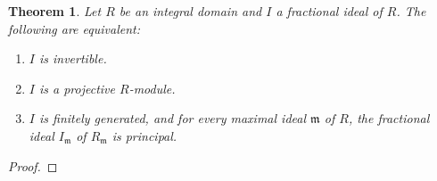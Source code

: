 \documentclass[11pt]{article}
\theoremstyle{thmstyle}
\newtheorem{theorem}{Theorem}[section]
\theoremstyle{defstyle}
\newcommand{\frakm}{\mathfrak{m}} %
\begin{document}
\begin{theorem}
    Let $R$ be an integral domain and $I$ a fractional ideal of $R$. The following are equivalent: 
    \begin{enumerate}[label=(\arabic*)]
        \item $I$ is invertible. 
        \item $I$ is a projective $R$-module. 
        \item $I$ is finitely generated, and for every maximal ideal $\frakm$ of $R$, the fractional ideal $I_\frakm$ of $R_\frakm$ is principal.
    \end{enumerate}
\end{theorem}
\begin{proof}
    
\end{proof}
\end{document}
